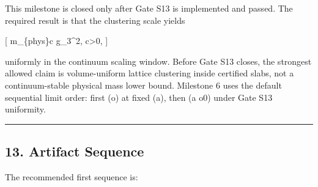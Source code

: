 \documentclass[
]{article}
\begin{document}
This milestone is closed only after Gate S13 is implemented and passed.
The required result is that the clustering scale yields

{[} m\_\{\rm phys\}\ge c g\_3\^{}2, \qquad c\textgreater0, {]}

uniformly in the continuum scaling window. Before Gate S13 closes, the
strongest allowed claim is volume-uniform lattice clustering inside
certified slabs, not a continuum-stable physical mass lower bound.
Milestone 6 uses the default sequential limit order: first
(\Lambda  o\infty) at fixed (a), then (a o0) under Gate S13 uniformity.

\begin{center}\rule{0.5\linewidth}{0.5pt}\end{center}

\subsection{13. Artifact Sequence}\label{artifact-sequence}

The recommended first sequence is:
\end{document}
